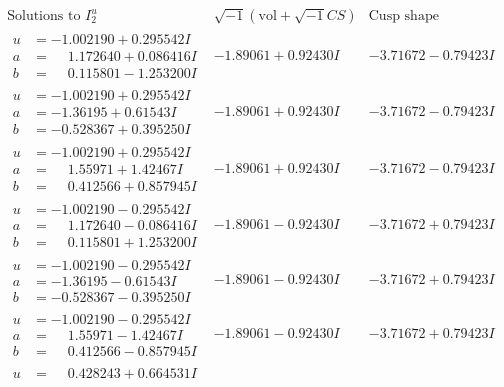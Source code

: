 \documentclass[1p]{elsarticle_modified}
\theoremstyle{definition}
\newcommand{\I}{\sqrt{-1}}
\begin{document}
$$\begin{array}{c|c|c}  
\text{Solutions to }I^u_{2}& \I (\text{vol} + \sqrt{-1}CS) & \text{Cusp shape}\\
 \hline 
\begin{aligned}
u &= -1.002190 + 0.295542 I \\
a &= \phantom{-}1.172640 + 0.086416 I \\
b &= \phantom{-}0.115801 - 1.253200 I\end{aligned}
 & -1.89061 + 0.92430 I & -3.71672 - 0.79423 I \\ \hline\begin{aligned}
u &= -1.002190 + 0.295542 I \\
a &= -1.36195 + 0.61543 I \\
b &= -0.528367 + 0.395250 I\end{aligned}
 & -1.89061 + 0.92430 I & -3.71672 - 0.79423 I \\ \hline\begin{aligned}
u &= -1.002190 + 0.295542 I \\
a &= \phantom{-}1.55971 + 1.42467 I \\
b &= \phantom{-}0.412566 + 0.857945 I\end{aligned}
 & -1.89061 + 0.92430 I & -3.71672 - 0.79423 I \\ \hline\begin{aligned}
u &= -1.002190 - 0.295542 I \\
a &= \phantom{-}1.172640 - 0.086416 I \\
b &= \phantom{-}0.115801 + 1.253200 I\end{aligned}
 & -1.89061 - 0.92430 I & -3.71672 + 0.79423 I \\ \hline\begin{aligned}
u &= -1.002190 - 0.295542 I \\
a &= -1.36195 - 0.61543 I \\
b &= -0.528367 - 0.395250 I\end{aligned}
 & -1.89061 - 0.92430 I & -3.71672 + 0.79423 I \\ \hline\begin{aligned}
u &= -1.002190 - 0.295542 I \\
a &= \phantom{-}1.55971 - 1.42467 I \\
b &= \phantom{-}0.412566 - 0.857945 I\end{aligned}
 & -1.89061 - 0.92430 I & -3.71672 + 0.79423 I \\ \hline\begin{aligned}
u &= \phantom{-}0.428243 + 0.664531 I \\

\end{aligned}
\end{array}$$
\end{document}
